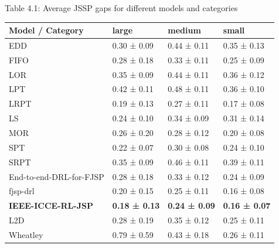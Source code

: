 \begin{table}[H]
    Table 4.1: Average JSSP gaps for different models and categories\\
    \vspace{1mm}
    \begin{tabular}{llll}
        \toprule
        Model / Category & large & medium & small \\
        \midrule
        EDD & 0.30 ± 0.09 & 0.44 ± 0.11 & 0.35 ± 0.13 \\
        FIFO & 0.28 ± 0.18 & 0.33 ± 0.11 & 0.25 ± 0.09 \\
        LOR & 0.35 ± 0.09 & 0.44 ± 0.11 & 0.36 ± 0.12 \\
        LPT & 0.42 ± 0.11 & 0.48 ± 0.11 & 0.36 ± 0.10 \\
        LRPT & 0.19 ± 0.13 & 0.27 ± 0.11 & 0.17 ± 0.08 \\
        LS & 0.24 ± 0.10 & 0.34 ± 0.09 & 0.31 ± 0.14 \\
        MOR & 0.26 ± 0.20 & 0.28 ± 0.12 & 0.20 ± 0.08 \\
        SPT & 0.22 ± 0.07 & 0.30 ± 0.08 & 0.24 ± 0.10 \\
        SRPT & 0.35 ± 0.09 & 0.46 ± 0.11 & 0.39 ± 0.11 \\
        End-to-end-DRL-for-FJSP & 0.28 ± 0.18 & 0.33 ± 0.12 & 0.24 ± 0.09 \\
        fjsp-drl & 0.20 ± 0.15 & 0.25 ± 0.11 & 0.16 ± 0.08 \\
        \textbf{IEEE-ICCE-RL-JSP} & \textbf{0.18 ± 0.13} & \textbf{0.24 ± 0.09} & \textbf{0.16 ± 0.07} \\
        L2D & 0.28 ± 0.19 & 0.35 ± 0.12 & 0.25 ± 0.11 \\
        Wheatley & 0.79 ± 0.59 & 0.43 ± 0.18 & 0.26 ± 0.11 \\
        \bottomrule
    \end{tabular}
\end{table}

